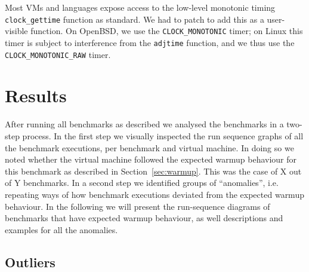 \documentclass[10pt,preprint]{sigplanconf}
\begin{document}
Most VMs and languages expose access to the low-level monotonic timing
\texttt{clock\_gettime} function as standard. We had to patch  to add this as a user-visible function. On OpenBSD, we use
the \texttt{CLOCK\_MONOTONIC} timer; on Linux this timer is subject to
interference from the \texttt{adjtime} function, and we thus use the
\texttt{CLOCK\_MONOTONIC\_RAW} timer.


\section{Results}
\label{sec:Results}


After running all benchmarks as described we analysed the benchmarks in a
two-step process. In the first step we visually inspected the run sequence
graphs of all the benchmark executions, per benchmark and virtual machine. In
doing so we noted whether the virtual machine followed the expected warmup
behaviour for this benchmark as described in Section~\ref{sec:warmup}. This was
the case of  X out of Y benchmarks. In a second step we
identified groups of ``anomalies'', i.e. repeating ways of how benchmark
executions deviated from the expected warmup behaviour. In the following we will
present the run-sequence diagrams of benchmarks that have expected warmup
behaviour, as well descriptions and examples for all the anomalies.







\subsection{Outliers}
\label{sub:outliers}
\end{document}
